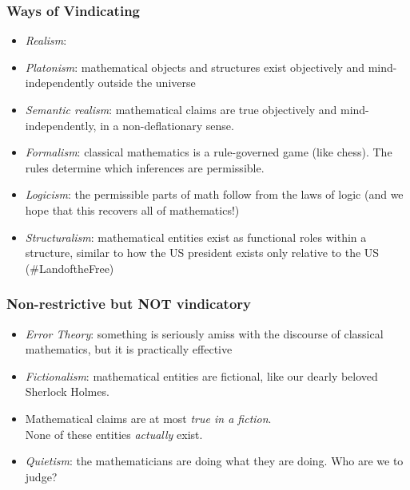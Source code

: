 \begin{frame}
\frametitle{Ways of Vindicating}

\begin{itemize}[<+->]

\item \emph{Realism}:

\bi

\item \textit{Platonism}: mathematical objects and structures exist objectively and mind-independently outside the universe

\item \textit{Semantic realism}: mathematical claims are true objectively and mind-independently, in a non-deflationary sense. 

\ei

\bigskip

\item \emph{Formalism}: classical mathematics is a rule-governed game (like chess). The rules determine which inferences are permissible.

\item \emph{Logicism}: the permissible parts of math follow from the laws of logic (and we hope that this recovers all of mathematics!)

\item \emph{Structuralism}: mathematical entities exist as functional roles within a structure, similar to how the US president exists only relative to the US (\#LandoftheFree) 




\end{itemize}
\end{frame}

\begin{frame}
\frametitle{Non-restrictive but NOT vindicatory}

\begin{itemize}[<+->]

\item \emph{Error Theory}: something is seriously amiss with the discourse of classical mathematics, but it is practically effective

\bi
\item \textit{Fictionalism}: mathematical entities are fictional, like our dearly beloved Sherlock Holmes. 
\item Mathematical claims are at most \textit{true in a fiction}. \\ None of these entities \textit{actually} exist.
\ei

\bigskip 

\item \emph{Quietism}: the mathematicians are doing what they are doing. Who are we to judge? 



\end{itemize}
\end{frame}

